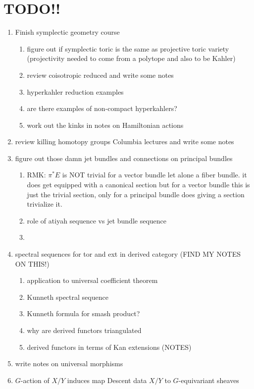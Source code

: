 \documentclass[12pt]{article}
\begin{document}
\sloppy

\section{TODO!!}

\begin{enumerate}
\item Finish symplectic geometry course
\begin{enumerate}
\item figure out if symplectic toric is the same as projective toric variety (projectivity needed to come from a polytope and also to be Kahler)
\item review coisotropic reduced and write some notes
\item hyperkahler reduction examples 
\item are there examples of non-compact hyperkahlers?
\item work out the kinks in notes on Hamiltonian actions
\end{enumerate}
\item review killing homotopy groups Columbia lectures and write some notes
\item figure out those damn jet bundles and connections on principal bundles
\begin{enumerate}
\item RMK: $\pi^* E$ is NOT trivial for a vector bundle let alone a fiber bundle. it does get equipped with a canonical section but for a vector bundle this is just the trivial section, only for a principal bundle does giving a section trivialize it.
\item role of atiyah sequence vs jet bundle sequence
\item 
\end{enumerate}
\item spectral sequences for tor and ext in derived category (FIND MY NOTES ON THIS!)
\begin{enumerate}
\item application to universal coefficient theorem
\item Kunneth spectral sequence
\item Kunneth formula for smash product?
\item why are derived functors triangulated
\item derived functors in terms of Kan extensions (NOTES)
\end{enumerate}
\item write notes on universal morphisms
\item $G$-action of $X/Y$ induces map Descent data $X/Y$ to $G$-equivariant sheaves

\end{enumerate}
\end{document}
